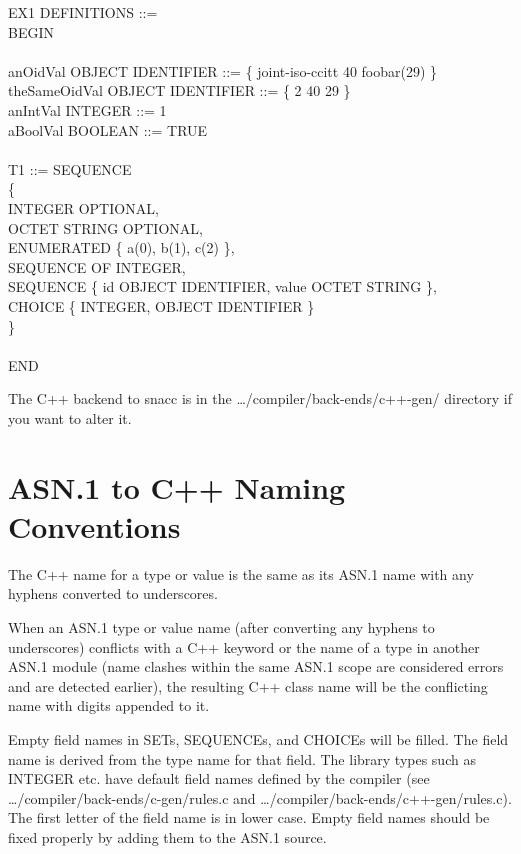 \begin{ASNcode}
EX1 DEFINITIONS ::=\\
BEGIN\\
\\
anOidVal      OBJECT IDENTIFIER ::= \{ joint-iso-ccitt 40 foobar(29) \}\\
theSameOidVal OBJECT IDENTIFIER ::= \{ 2 40 29 \}\\
anIntVal      INTEGER ::= 1\\
aBoolVal      BOOLEAN ::= TRUE\\
\\
T1 ::= SEQUENCE\\
\{\+\\
  INTEGER OPTIONAL,\\
  OCTET STRING OPTIONAL,\\
  ENUMERATED \{ a(0), b(1), c(2) \},\\
  SEQUENCE OF INTEGER,\\
  SEQUENCE \{ id OBJECT IDENTIFIER, value OCTET STRING \},\\
  CHOICE \{ INTEGER, OBJECT IDENTIFIER \}\-\\
\}\\
\\
END
\end{ASNcode}

The C++ backend to snacc is in the {\ufn \dots/compiler/back-ends/c++-gen/} directory if you want to alter it.

\section{\label{naming-C++-section}ASN.1 to C++ Naming Conventions}

The C++ name for a type or value is the same as its ASN.1 name with
any hyphens converted to underscores.

When an ASN.1 type or value name (after converting any hyphens to
underscores) conflicts with a C++ keyword or the name of a type in
another ASN.1 module (name clashes within the same ASN.1 scope are
considered errors and are detected earlier), the resulting C++ class
name will be the conflicting name with digits appended to it.

Empty field names in SETs, SEQUENCEs, and CHOICEs will be filled.  The
field name is derived from the type name for that field. The library
types such as INTEGER etc. have default field names defined by the
compiler (see {\ufn \dots/compiler/back-ends/c-gen/rules.c} and
{\ufn \dots/compiler/back-ends/c++-gen/rules.c}).
The first letter of the field name is in lower case.
Empty field names should be fixed properly by adding them to the ASN.1 source.

